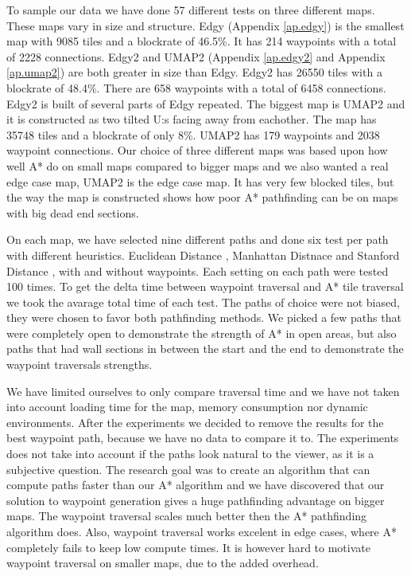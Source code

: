 \documentclass[a4paper]{article}
\begin{document}
{To sample our data we have done 57 different tests on three different maps. These maps vary in size and structure. Edgy (Appendix \ref{ap.edgy}) is the smallest map with 9085 tiles and a blockrate of 46.5\%. It has 214 waypoints with a total of 2228 connections. Edgy2 and UMAP2 (Appendix \ref{ap.edgy2} and Appendix \ref{ap.umap2}) are both greater in size than Edgy. Edgy2 has 26550 tiles with a blockrate of 48.4\%. There are 658 waypoints with a total of 6458 connections. Edgy2 is built of several parts of Edgy repeated. The biggest map is UMAP2 and it is constructed as two tilted U:s facing away from eachother. The map has 35748 tiles and a blockrate of only 8\%. UMAP2 has 179 waypoints and 2038 waypoint connections. Our choice of three different maps was based upon how well A* do on small maps compared to bigger maps and we also wanted a real edge case map, UMAP2 is the edge case map. It has very few blocked tiles, but the way the map is constructed shows how poor A* pathfinding can be on maps with big dead end sections.
	
On each map, we have selected nine different paths and done six test per path with different heuristics. Euclidean Distance \cite{heuristicRef}, Manhattan Distnace \cite{heuristicRef} and Stanford Distance \cite{heuristicRef}, with and without waypoints.
Each setting on each path were tested 100 times. To get the delta time between waypoint traversal and A* tile traversal we took the avarage total time of each test. The paths of choice were not biased, they were chosen to favor both pathfinding methods. We picked a few paths that were completely open to demonstrate the strength of A* in open areas, but also paths that had wall sections in between the start and the end to demonstrate the waypoint traversals strengths.

We have limited ourselves to only compare traversal time and we have not taken into account loading time for the map, memory consumption nor dynamic environments. After the experiments we decided to remove the results for the best waypoint path, because we have no data to compare it to. The experiments does not take into account if the paths look natural to the viewer, as it is a subjective question. The research goal was to create an algorithm that can compute paths faster than our A* algorithm and we have discovered that our solution to waypoint generation gives a huge pathfinding advantage on bigger maps. The waypoint traversal scales much better then the A* pathfinding algorithm does. Also, waypoint traversal works excelent in edge cases, where A* completely fails to keep low compute times. It is however hard to motivate waypoint traversal on smaller maps, due to the added overhead.

}
\end{document}
